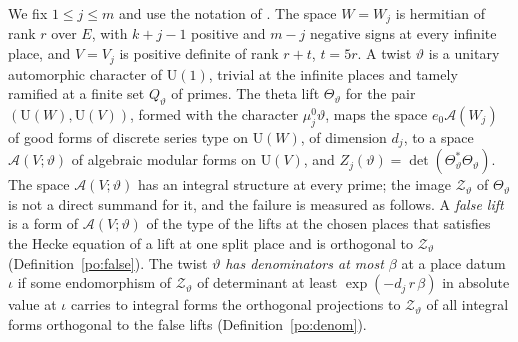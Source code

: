 \documentclass[10pt]{amsart}
\theoremstyle{definition}
\theoremstyle{remark}
\begin{document}
We fix $1\le j\le m$ and use the notation of {\cite[\S\S14.1--14.3]{P46}}. The
space $W=W_j$ is hermitian of rank $r$ over $E$, with $k+j-1$ positive and $m-j$ negative signs
at every infinite place, and $V=V_j$ is positive definite of rank $r+t$, $t=5r$. A twist
$\vartheta$ is a unitary automorphic character of $\mathrm U(1)$, trivial at the infinite places
and tamely ramified at a finite set $Q_\vartheta$ of primes. The theta lift $\Theta_\vartheta$
for the pair $(\mathrm U(W),\mathrm U(V))$, formed with the character $\mu_j^0\vartheta$, maps
the space $e_0\mathcal A(W_j)$ of good forms of discrete series type on $\mathrm U(W)$, of
dimension $d_j$, to a space $\mathcal A(V;\vartheta)$ of algebraic modular forms on
$\mathrm U(V)$, and $Z_j(\vartheta)=\det(\Theta_\vartheta^*\Theta_\vartheta)$. The space
$\mathcal A(V;\vartheta)$ has an integral structure at every prime; the image
$\mathcal Z_\vartheta$ of $\Theta_\vartheta$ is not a direct summand for it, and the failure is
measured as follows. A \emph{false lift} is a form of $\mathcal A(V;\vartheta)$ of the type of
the lifts at the chosen places that satisfies the Hecke equation of a lift at one split place
and is orthogonal to $\mathcal Z_\vartheta$ (Definition~\ref{po:false}). The twist $\vartheta$
\emph{has denominators at most $\beta$} at a place datum $\iota$ if some endomorphism of
$\mathcal Z_\vartheta$ of determinant at least $\exp(-d_j\,r\,\beta)$ in absolute value at
$\iota$ carries to integral forms the orthogonal projections to $\mathcal Z_\vartheta$ of all
integral forms orthogonal to the false lifts (Definition~\ref{po:denom}).
\end{document}

